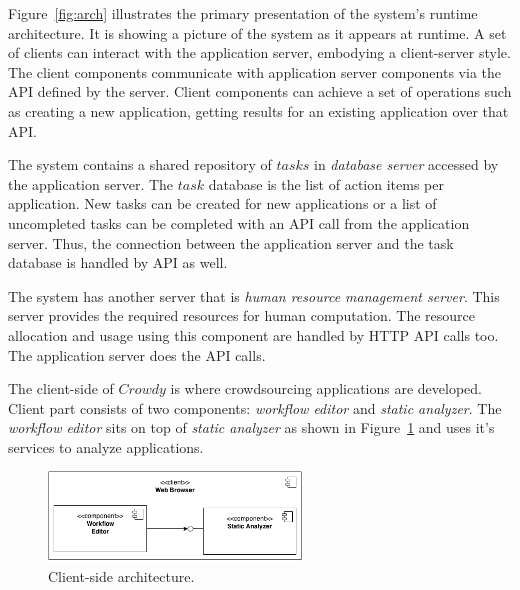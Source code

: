 Figure~\ref{fig:arch} illustrates the primary presentation of the system's 
runtime architecture. It is showing a picture of the system as it appears at runtime. 
A set of clients can interact with the application server, embodying a client-server 
style. The client components communicate with application server components 
via the API defined by the server. Client components can achieve a set of operations 
such as creating a new application, getting results for an existing application over that API.

The system contains a shared repository of $tasks$ in \textit{database server} 
accessed by the application server. The $task$ database is the list of action 
items per application. New tasks can be created for new applications or a 
list of uncompleted tasks can be completed 
with an API call from the application server. Thus, the connection between the 
application server and the task database is handled by API as well.

The system has another server that is \textit{human resource management server}. This 
server provides the required resources for human computation. The resource 
allocation and usage using this component are handled by HTTP API calls too. 
The application server does the API calls.


The client-side of $Crowdy$ is where crowdsourcing applications are developed. Client 
part consists of two components: \textit{workflow editor} and \textit{static analyzer}. The 
\textit{workflow editor} sits on top of \textit{static analyzer} as shown in 
Figure~\ref{fig:clientdecomposition} and uses it's services to analyze applications.

\begin{figure}[ht]
	\centering
	\includegraphics[width=0.6\textwidth]{figures/architecture/CC2.png}
	\caption{Client-side architecture.}
	\label{fig:clientdecomposition}
\end{figure}

